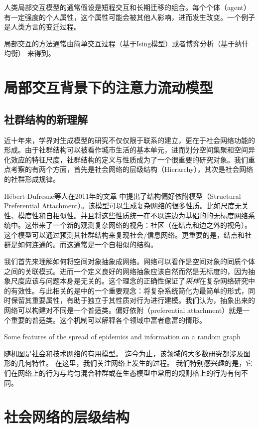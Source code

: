 人类局部交互模型的通常假设是短程交互和长期迁移的组合。每个个体（agent）有一定强度的个人属性，这个属性可能会被其他人影响，进而发生改变。一个例子是人类方言的变迁过程\cite{PhysRevX.7.031008}。

局部交互的方法通常由简单交互过程（基于Ising模型）或者博弈分析（基于纳什均衡）\cite{grimalda2016social,Mussa2019Urbanity} 来得到。

\section{局部交互背景下的注意力流动模型}

\subsection{社群结构的新理解}

近十年来，学界对生成模型的研究不仅仅限于联系的建立，更在于社会网络功能的形成。由于社群结构可以被看作城市生活的基本单元，进而划分空间集聚和空间异化效应的特征尺度，社群结构的定义与性质成为了一个很重要的研究对象。我们重点考察的有两个方面，首先是社会网络的层级结构（Hierarchy），其次是社会网络的社群形成规律。

Hébert-Dufresne等人在2011年的文章\cite{PhysRevLett.107.158702} 中提出了结构偏好依附模型（Structural Preferential Attachment）。该模型可以生成复杂网络的很多性质。比如尺度无关性、模度性和自相似性。并且将这些性质统一在不以连边为基础的的无标度网络系统中。这带来了一个新的观测复杂网络的视角：社区（在结点和边之外的视角）。这个模型可以通过预测其社群结构来复现社会/信息网络。更重要的是，结点和社群是如何连通的。而这通常是一个自相似的结构。

我们首先来理解如何将空间对象抽象成网络。网络可以看作是空间对象的同质个体之间的关联模式。进而一个定义良好的网络抽象应该自然而然是无标度的，因为抽象尺度应该与问题本身是无关的。这个理念的正确性保证了\emph{采样}在复杂网络研究中的有效性。与此相关的是\cite{PhysRevLett.107.158702}中的一个重要观念：将复杂系统简化为最简单的形式，同时保留其重要属性，有助于独立于其性质对行为进行建模。我们认为，抽象出来的网络可以构建对不同是一个普适类。偏好依附（preferential attachment）就是一个重要的普适类。这个机制可以解释各个领域中富者愈富的情形。

Some features of the spread of epidemics and information on a random graph

随机图是社会和技术网络的有用模型。 迄今为止，该领域的大多数研究都涉及图形的几何特性。 在这里，我们关注网络上发生的过程。 我们特别感兴趣的是，它们在网络上的行为与均匀混合种群或在生态模型中常用的规则格上的行为有何不同。

\section{社会网络的层级结构}
